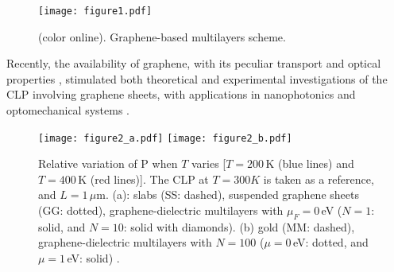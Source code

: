 \documentclass[aps,pra,superscriptaddress,amsmath,amssymb,showpacs,twocolumn,notitlepage]{revtex4-1}
\begin{document}
\begin{figure}[!ht]
\texttt{[image: figure1.pdf]}
\caption{\footnotesize (color online). Graphene-based multilayers scheme. \label{fig:figure_1}}
\end{figure}

Recently, the availability of graphene, with its peculiar transport and optical properties \cite{CastroRMP2008}, stimulated both theoretical \cite{Rubio06,Gomez09,Woods10,Svetovoy11,Mostepanenko14,Bordag15,Mostepanenko16} and experimental \cite{Banishev13} investigations of the CLP involving graphene sheets, with applications in nanophotonics and optomechanical systems \cite{Antezza2016}. 

\begin{figure}[!ht]
\texttt{[image: figure2\_a.pdf]}
\texttt{[image: figure2\_b.pdf]}
\caption{\footnotesize {Relative variation of $\textrm{P}$ when $T$ varies [$T=200\,$K (blue lines) and $T=400\,$K (red lines)]. The CLP at $T=300K$ is taken as a reference, and $L=1\,\mu$m. (a): slabs (SS: dashed), suspended graphene sheets (GG: dotted), graphene-dielectric multilayers with $\mu_F=0\,$eV  ($N=1$:  solid, and $N=10$: solid with diamonds).  (b) gold (MM: dashed), graphene-dielectric multilayers with $N=100$ ($\mu=0\,$eV: dotted, and $\mu=1\,$eV: solid) \label{fig:figure_2}}.}
\end{figure}
\end{document}
